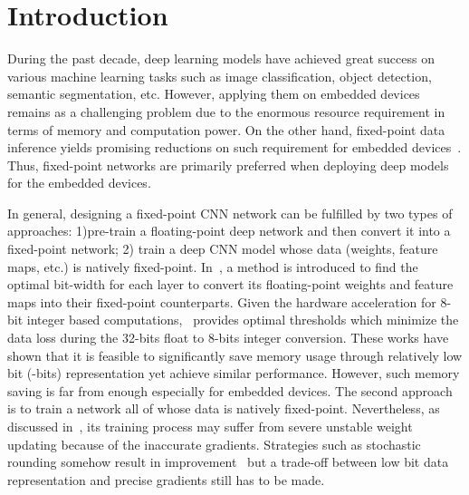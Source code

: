 \documentclass[10pt,twocolumn,letterpaper]{article}
\begin{document}
\section{Introduction}\label{sec:intro}





During the past decade, deep learning models have achieved great success on various machine learning tasks such as image classification, object detection, semantic segmentation, etc. However, applying them on embedded devices remains as a challenging problem due to the enormous resource requirement in terms of memory and computation power. On the other hand, fixed-point data inference yields promising reductions on such requirement for embedded devices~\cite{Fixed-pointEnergy}. Thus, fixed-point networks are primarily preferred when deploying deep models for the embedded devices.

In general, designing a fixed-point CNN network can be fulfilled by two types of approaches: 1)pre-train a floating-point deep network and then convert it into a fixed-point network; 2) train a deep CNN model whose data (\eg weights, feature maps, etc.) is natively fixed-point.
In~\cite{LinFixPoint}, a method is introduced to find the optimal bit-width for each layer to convert its floating-point weights and feature maps into their fixed-point counterparts. Given the hardware acceleration for 8-bit integer based computations,~\cite{NvidiaInt8} provides optimal thresholds which minimize the data loss during the 32-bits float to 8-bits integer conversion. These works have shown that it is feasible to significantly save memory usage through relatively low bit (-bits) representation yet achieve similar performance. However, such memory saving is far from enough especially for embedded devices. The second approach is to train a network all of whose data is natively fixed-point. Nevertheless, as discussed in~\cite{LinOvercomming}, its training process may suffer from severe unstable weight updating because of the inaccurate gradients. Strategies such as stochastic rounding somehow result in improvement~\cite{FixTrain1,FixTrain2,FixTrain3} but a trade-off between low bit data representation and precise gradients still has to be made.
\end{document}
